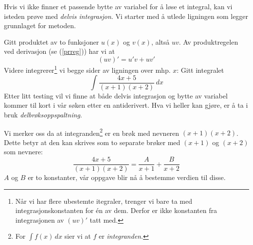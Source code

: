 Hvis vi ikke finner et passende bytte av variabel for å løse et integral, kan vi isteden prøve med \textit{delvis integrasjon}. Vi starter med å utlede ligningen som legger grunnlaget for metoden.\vsk

Gitt produktet av to funksjoner $ u(x) $ og $ v(x) $, altså $ uv $. Av produktregelen ved derivasjon (se (\ref{prreg})) har vi at
\[ (uv)'=u'v+uv' \]
Videre integrerer\footnote{Når vi har flere ubestemte itegraler, trenger vi bare ta med integrasjonskonstanten for én av dem. Derfor er ikke konstanten fra integrasjonen av $ (uv)' $ tatt med.} vi begge sider av ligningen over mhp. $ x $:
\dint
\dinte
\newpage
\dinteto
{}
Gitt integralet
\[\int  \frac{4x+5}{(x+1)(x+2)} \,dx \]
Etter litt testing vil vi finne at både delvis integrasjon og bytte av variabel kommer til kort i vår søken etter en antiderivert. Hva vi heller kan gjøre, er å ta i bruk \textit{delbrøksoppspaltning}. \vsk

Vi merker oss da at integranden\footnote{For $ \int f(x)\,dx $ sier vi at $ f $ er \textit{integranden}.} er en brøk med nevneren $ (x+1)(x+2) $. Dette betyr at den kan skrives som to separate brøker med $ (x+1) $ og $ (x+2) $ som nevnere:
\begin{equation}
\frac{4x+5}{(x+1)(x+2)} = \frac{A}{x+1}+\frac{B}{x+2} \label{delbr}
\end{equation}
$ A $ og $ B $ er to konstanter, vår oppgave blir nå å bestemme verdien til disse.\vsk

